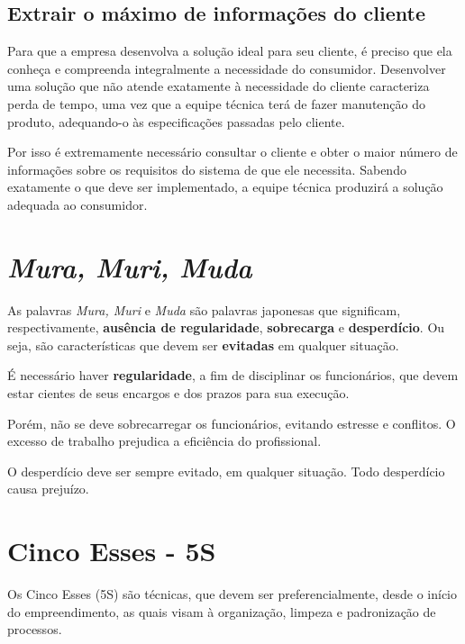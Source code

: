 \documentclass{article}
\begin{document}
\subsection{Extrair o máximo de informações do cliente}

Para que a empresa desenvolva a solução ideal para seu cliente, é preciso que
ela conheça e compreenda integralmente a necessidade do consumidor. Desenvolver
uma solução que não atende exatamente à necessidade do cliente caracteriza perda
de tempo, uma vez que a equipe técnica terá de fazer manutenção do produto,
adequando-o às especificações passadas pelo cliente.

Por isso é extremamente necessário consultar o cliente e obter o maior número de
informações sobre os requisitos do sistema de que ele necessita. Sabendo
exatamente o que deve ser implementado, a equipe técnica produzirá a solução
adequada ao consumidor.





\section{\textit{Mura, Muri, Muda}}

As palavras \textit{Mura, Muri} e \textit{Muda} são palavras japonesas que
significam, respectivamente, \textbf{ausência de regularidade}, \textbf{sobrecarga}
e \textbf{desperdício}. Ou seja, são características que devem ser \textbf{evitadas}
em qualquer situação.

É necessário haver \textbf{regularidade}, a fim de disciplinar os funcionários,
que devem estar cientes de seus encargos e dos prazos para sua execução.

Porém, não se deve sobrecarregar os funcionários, evitando estresse e conflitos.
O excesso de trabalho prejudica a eficiência do profissional.

O desperdício deve ser sempre evitado, em qualquer situação. Todo desperdício
causa prejuízo.







\section{Cinco Esses - 5S}

Os Cinco Esses (5S) são técnicas, que devem ser preferencialmente, desde o
início do empreendimento, as quais visam à organização, limpeza e padronização
de processos.
\end{document}
